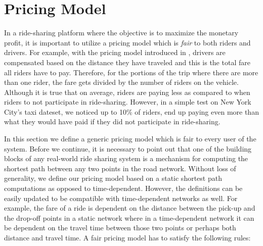 \section{Pricing Model}
\label{sec:pricing}


In a ride-sharing platform where the objective is to maximize the monetary profit, it is important to utilize a pricing model which is \textit{fair} to both riders and drivers. For example, with the pricing model introduced in \cite{Ma13}, drivers are compensated based on the distance they have traveled and this is the total fare all riders have to pay. Therefore, for the portions of the trip where there are more than one rider, the fare gets divided by the number of riders on the vehicle. Although it is true that on average, riders are paying less as compared to when riders to not participate in ride-sharing. However, in a simple test on New York City's taxi dateset, we noticed up to 10\% of riders, end up paying even more than what they would have paid if they did not participate in ride-sharing.

In this section we define a generic pricing model which is fair to every user of the system. Before we continue, it is necessary to point out that one of the building blocks of any real-world ride sharing system is a mechanism for computing the shortest path between any two points in the road network. Without loss of generality, we define our pricing model based on a static shortest path computations as opposed to time-dependent. However, the definitions can be easily updated to be compatible with time-dependent networks as well. For example, the fare of a ride is dependent on the distance between the pick-up and the drop-off points in a static network where in a time-dependent network it can be dependent on the travel time between those two points or perhaps both distance and travel time. A fair pricing model has to satisfy the following rules:


